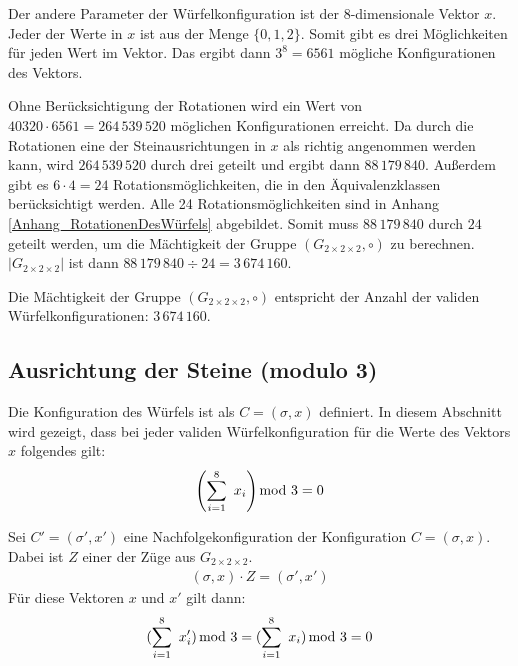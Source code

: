 \documentclass[12pt,a4paper, usenames, dvipsnames]{article}
\theoremstyle{mystyle}
\theoremstyle{definition}
\newcommand{\Gtwo}{\ensuremath{G_{2\times 2\times 2}}}
\begin{document}
Der andere Parameter der Würfelkonfiguration ist der 8-dimensionale Vektor $x$. Jeder der Werte in $x$ ist aus der Menge $\{0,1,2\}$. Somit gibt es drei Möglichkeiten für jeden Wert im Vektor. Das ergibt dann $3^8 = 6561$ mögliche Konfigurationen des Vektors.

Ohne Berücksichtigung der Rotationen wird ein Wert von $40320 \cdot 6561 = 264 \, 539 \, 520$ möglichen Konfigurationen erreicht. 
Da durch die Rotationen eine der Steinausrichtungen in $x$ als richtig angenommen werden kann, wird $264 \, 539 \, 520$ durch drei geteilt und ergibt dann $88 \, 179 \, 840$. 
Außerdem gibt es $6 \cdot 4 = 24$ Rotationsmöglichkeiten, die in den Äquivalenzklassen berücksichtigt werden. Alle 24 Rotationsmöglichkeiten sind in Anhang \ref{Anhang_RotationenDesWürfels} abgebildet. Somit muss $88 \, 179 \, 840$ durch $24$ geteilt werden, um die Mächtigkeit der Gruppe $(\Gtwo,\circ)$ zu berechnen. $|\Gtwo|$ ist dann $88 \, 179 \, 840 \div 24 = 3\, 674\, 160$.

Die Mächtigkeit der Gruppe $(\Gtwo,\circ)$ entspricht der Anzahl der validen Würfelkonfigurationen: $3\, 674\, 160$.



%
%
%
%
%
%
%
%
%
%
%
%
%
%
%
%
%
%
%
%
\subsection{Ausrichtung der Steine (modulo 3)}

\label{Abschnitt_Modulo3}

Die Konfiguration des Würfels ist als $C=(\sigma, x)$ definiert. In diesem Abschnitt wird gezeigt, dass bei jeder validen Würfelkonfiguration für die Werte des Vektors $x$ folgendes gilt: 
\begin{displaymath}
\left( \sum_{i= 1}^{8} \ x_i \right) \hspace*{-0.7em} \mod 3 = 0 
\end{displaymath} 

Sei $C'=(\sigma', x')$ eine Nachfolgekonfiguration der Konfiguration $C=(\sigma, x)$.  Dabei ist $Z$ einer der Züge aus $\Gtwo$.  
\begin{align*}
{(\sigma, x) \cdot Z = (\sigma', x')}
\end{align*}
Für diese Vektoren $x$ und $x'$ gilt dann:
\begin{align*}
(\sum_{i= 1}^{8} \ x_i') \hspace*{-0.5em} \mod 3 = (\sum_{i= 1}^{8} \  x_i) \hspace*{-0.5em} \mod 3 = 0
\end{align*}
\end{document}

